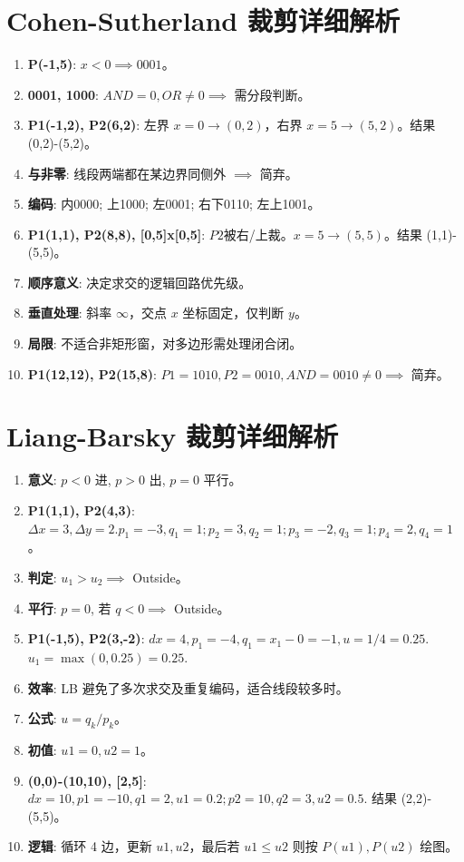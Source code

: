 \documentclass[UTF8]{ctexart}
\begin{document}
\section{Cohen-Sutherland 裁剪详细解析}
\begin{enumerate}
    \item \textbf{P(-1,5)}: $x < 0 \implies 0001$。
    \item \textbf{0001, 1000}: $AND = 0, OR \ne 0 \implies$ 需分段判断。
    \item \textbf{P1(-1,2), P2(6,2)}: 左界 $x=0 \to (0,2)$，右界 $x=5 \to (5,2)$。结果 (0,2)-(5,2)。
    \item \textbf{与非零}: 线段两端都在某边界同侧外 $\implies$ 简弃。
    \item \textbf{编码}: 内0000; 上1000; 左0001; 右下0110; 左上1001。
    \item \textbf{P1(1,1), P2(8,8), [0,5]x[0,5]}: $P2$被右/上裁。$x=5 \to (5,5)$。结果 (1,1)-(5,5)。
    \item \textbf{顺序意义}: 决定求交的逻辑回路优先级。
    \item \textbf{垂直处理}: 斜率 $\infty$，交点 $x$ 坐标固定，仅判断 $y$。
    \item \textbf{局限}: 不适合非矩形窗，对多边形需处理闭合闭。
    \item \textbf{P1(12,12), P2(15,8)}: $P1=1010, P2=0010, AND=0010 \ne 0 \implies$ 简弃。
\end{enumerate}

\section{Liang-Barsky 裁剪详细解析}
\begin{enumerate}
    \item \textbf{意义}: $p<0$ 进, $p>0$ 出, $p=0$ 平行。
    \item \textbf{P1(1,1), P2(4,3)}: $\Delta x=3, \Delta y=2. p_1=-3, q_1=1; p_2=3, q_2=1; p_3=-2, q_3=1; p_4=2, q_4=1$。
    \item \textbf{判定}: $u_1 > u_2 \implies$ Outside。
    \item \textbf{平行}: $p=0$, 若 $q<0 \implies$ Outside。
    \item \textbf{P1(-1,5), P2(3,-2)}: $dx=4, p_1=-4, q_1=x_1-0=-1, u=1/4=0.25$. $u_1 = \max(0, 0.25) = 0.25$.
    \item \textbf{效率}: LB 避免了多次求交及重复编码，适合线段较多时。
    \item \textbf{公式}: $u = q_k/p_k$。
    \item \textbf{初值}: $u1=0, u2=1$。
    \item \textbf{(0,0)-(10,10), [2,5]}: $dx=10, p1=-10, q1=2, u1=0.2; p2=10, q2=3, u2=0.5$. 结果 (2,2)-(5,5)。
    \item \textbf{逻辑}: 循环 4 边，更新 $u1, u2$，最后若 $u1 \le u2$ 则按 $P(u1), P(u2)$ 绘图。
\end{enumerate}
\end{document}

